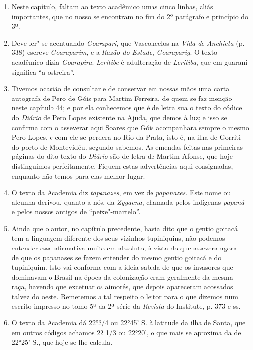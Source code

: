 \begin{enumerate}
\item Neste capítulo, faltam ao texto acadêmico umas cinco linhas, aliás importantes, que 
no nosso se encontram no fim do 2º parágrafo e princípio do 3º.

\item  Deve ler"-se acentuando \textit{Goarapari}, que Vasconcelos na \textit{Vida de Anchieta} 
(p. 338) escreve \textit{Goaraparim}, e a \textit{Razão do Estado}, \textit{Goaraparig}. O
texto acadêmico dizia \textit{Goarapira}. \textit{Leritibe} é adulteração de \textit{Leritiba}, que
em guarani significa ``a ostreira''.

\item Tivemos ocasião de consultar e de conservar em nossas mãos uma carta autografa de 
Pero de Góis para Martim Ferreira, de quem se faz menção neste capítulo 44; e por ela 
conhecemos que é de letra sua o texto do códice do \textit{Diário} de Pero Lopes existente na 
Ajuda, que demos à luz; e isso se confirma com o asseverar aqui Soares que Góis 
acompanhara sempre o mesmo Pero Lopes, e com ele se perdera no Rio da Prata, isto é, 
na ilha de Gorriti do porto de Montevidéu, segundo sabemos. As emendas feitas nas 
primeiras páginas do dito texto do \textit{Diário} são de letra de Martim Afonso, que hoje 
distinguimos perfeitamente. Fiquem estas advertências aqui consignadas,  enquanto 
não temos para elas melhor lugar.

\item O texto da Academia diz \textit{tapanazes}, em vez de \textit{papanazes}. Este nome ou alcunha 
derivou, quanto a nós, da \textit{Zygaena}, chamada pelos indígenas \textit{papaná} e pelos nossos 
antigos de ``peixe"-martelo''.

\item  Ainda que o autor, no capítulo precedente, havia dito que o gentio goitacá tem a 
linguagem diferente dos seus vizinhos tupiniquins, não podemos entender essa afirmativa 
muito em absoluto, à vista do que assevera agora --- de que os papanases se fazem entender 
do mesmo gentio goitacá e do tupiniquim. Isto vai conforme com a ideia sabida de que os 
invasores que dominavam o Brasil na época da colonização eram geralmente da mesma raça, 
havendo que excetuar os aimorés, que depois apareceram acossados talvez do oeste. 
Remetemos a tal respeito o leitor para o que dizemos num escrito impresso no tomo 5º da 2ª 
série da \textit{Revista} do Instituto, p. 373 e ss.

\item O texto da Academia dá 22°3/4 ou 22°45' S. à latitude da ilha de Santa, que em 
outros códigos achamos 22 1/3 ou 22°20', o que mais se aproxima da de 22°25' S., que 
hoje se lhe calcula.


\end{enumerate}
